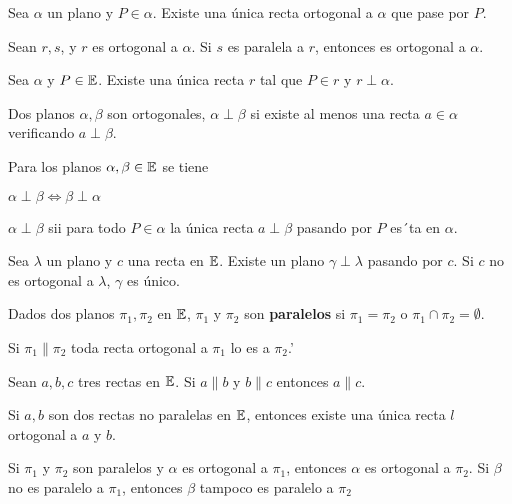   Sea $\alpha$ un plano y $P \in \alpha$. Existe una única recta ortogonal a $\alpha$ que pase por $P$.
 
  Sean $r,s$, y $r$ es ortogonal a $\alpha$. Si $s$ es paralela a $r$, entonces es ortogonal a $\alpha$.
 
 Sea $\alpha$ y $P \in \mathbb{E}$. Existe una única recta $r$ tal que $P \in r$ y $r\perp \alpha$.  
 
   Dos planos $\alpha, \beta$ son ortogonales, $\alpha \perp \beta$ si existe al menos una recta $a \in \alpha$ verificando $a \perp \beta$.
 
  Para los planos $\alpha, \beta \in \mathbb{E}$ se tiene
 \begin{itemizex}
 	\item $\alpha \perp \beta \iff \beta \perp \alpha$
 	\item $\alpha \perp \beta$ sii para todo $P  \in \alpha$ la única recta $a \perp \beta$ pasando por $P$ es´ta en $\alpha$.
 \end{itemizex}

 Sea $\lambda$ un plano y $c$ una recta en $\mathbb{E}$. Existe un plano $\gamma \perp \lambda$ pasando por $c$. Si $c$ no es ortogonal a $\lambda$, $\gamma$ es único.

 Dados dos planos $\pi_1, \pi_2$ en $\mathbb{E}$, $\pi_1$ y $\pi_2$ son \textbf{paralelos}
 si $\pi_1 = \pi_2$ o $\pi_1 \cap \pi_2 =  \emptyset$.
 
  Si $\pi_1 \parallel \pi_2$ toda recta ortogonal a $\pi_1$ lo es a $\pi_2$.'
 
  Sean $a,b,c$ tres rectas en $\mathbb{E}$. Si $a\parallel b$ y $b\parallel c$ entonces $a\parallel c$.
 
  Si $a,b$ son dos rectas no paralelas en $\mathbb{E}$, entonces existe una única recta $l$ ortogonal a $a$ y $b$.
 
  Si $\pi_1$ y $\pi_2$ son paralelos y $\alpha$ es ortogonal a $\pi_1$, entonces $\alpha$ es ortogonal a $\pi_2$. Si $\beta$ no es paralelo a $\pi_1$, entonces $\beta$ tampoco es paralelo a $\pi_2$